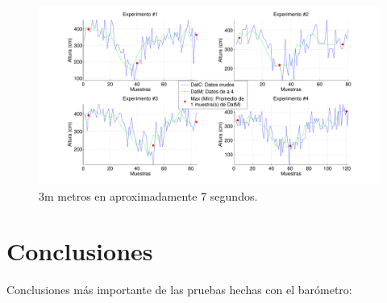 \documentclass[main]{subfiles}
\begin{document}
\begin{figure}[H]
\hspace{-25pt}
  \includegraphics[width=1.1\textwidth]{./pics_barom/estante_veloz.pdf}
  \caption{3m metros en aproximadamente 7 segundos.}
  \label{fig:estante_veloz.pdf}
\end{figure}

\section{Conclusiones}
\label{sec:conclusiones}

Conclusiones más importante de las pruebas hechas con el barómetro:
\end{document}
